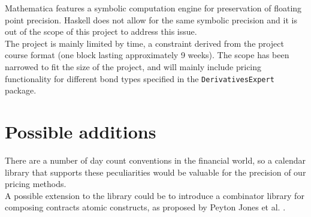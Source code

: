 \documentclass[11pt]{article}
\newcommand{\comm}[2]{{\sf \(\spadesuit\){\bf #1: }{\rm \sf #2}\(\spadesuit\)}}
\newcommand{\mcomm}[2]{\marginpar{\scriptsize \comm{#1}{#2}}}
\newcommand{\ab}[1]{\mcomm{AB}{#1}}
\begin{document}



Mathematica features a symbolic computation engine for preservation of floating point precision. Haskell
does not allow for the same symbolic precision and it is out of the scope of this project to address this issue.\\

The project is mainly limited by time, a constraint derived from the project course 
format (one block lasting approximately 9 weeks).
The scope has been narrowed to fit the size of the project, and will mainly include
pricing functionality for different bond types specified in the {\tt DerivativesExpert} package.

\section*{Possible additions}

There are a number of day count conventions in the financial world, so a
calendar library that supports these peculiarities would be valuable for the precision
of our pricing methods.\\



A possible extension to the library could be to introduce a combinator library for composing contracts
atomic constructs, as proposed by Peyton Jones et al. \cite{composingcontracts}.\\
\end{document}
